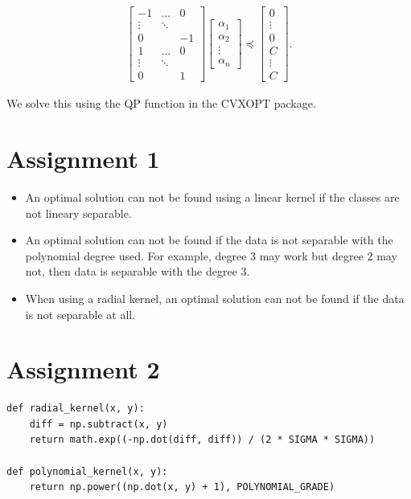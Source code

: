 \documentclass{article}
\begin{document}
\begin{align*}
\begin{bmatrix}
-1 & \hdots & 0 \\
\vdots & \ddots & \\
0  &  & -1 \\
1 & \hdots & 0 \\
\vdots & \ddots & \\
0  &  & 1
\end{bmatrix}
 \begin{bmatrix}
\alpha_1 \\
\alpha_2 \\
\vdots \\
\alpha_n 
\end{bmatrix}
\preccurlyeq
 \begin{bmatrix}
0 \\
\vdots \\
0 \\
C \\
\vdots \\
C
\end{bmatrix}.
\end{align*}


We solve this using the QP function in the CVXOPT package. 

\section*{Assignment 1}

\begin{itemize}
 \item An optimal solution can not be found using a linear kernel if the classes are not lineary separable.
 \item An optimal solution can not be found if the data is not separable with the polynomial degree used. 
 For example, degree 3 may work but degree 2 may not, then data is separable with the degree 3. 
 \item When using a radial kernel, an optimal solution can not be found if the data is not separable at all. 
\end{itemize}

\section*{Assignment 2}

\begin{lstlisting}
def radial_kernel(x, y):
    diff = np.subtract(x, y)
    return math.exp((-np.dot(diff, diff)) / (2 * SIGMA * SIGMA))

def polynomial_kernel(x, y):
	return np.power((np.dot(x, y) + 1), POLYNOMIAL_GRADE)
\end{lstlisting}
\end{document}
